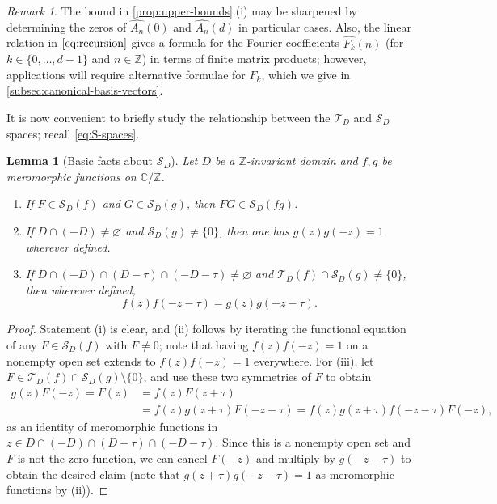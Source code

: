 \documentclass[reqno,11pt]{amsart}
\newtheorem{lemma}[theorem]{Lemma}
\theoremstyle{definition}
\theoremstyle{remark}
\newtheorem*{remark}{Remark}
\numberwithin{equation}{section}
\newcommand{\Z}{\mathbb{Z}}
\newcommand{\C}{\mathbb{C}}
\newcommand{\mT}{\mathcal{T}}
\newcommand{\mS}{\mathcal{S}}
\renewcommand{\hat}{\widehat}
\renewcommand{\emptyset}{\varnothing}
\begin{document}
\begin{remark}
The bound in \cref{prop:upper-bounds}.(i) may be sharpened by determining the zeros of $\hat{A_n}(0)$ and $\hat{A_n}(d)$ in particular cases. Also, the linear relation in $\cref{eq:recursion}$ gives a formula for the Fourier coefficients $\hat{F_k}(n)$ (for $k \in \{0, \ldots, d-1\}$ and $n \in \Z$) in terms of finite matrix products; however, applications will require alternative formulae for $F_k$, which we give in \cref{subsec:canonical-basis-vectors}.
\end{remark}

It is now convenient to briefly study the relationship between the $\mT_D$ and $\mS_D$ spaces; recall \cref{eq:S-spaces}.
\begin{lemma}[Basic facts about $\mS_D$] \label{lem:basic-S}
Let $D$ be a $\Z$-invariant domain and $f, g$ be meromorphic functions on $\C/\Z$.
\begin{enumerate}[label = (\roman*).]
    \item If $F \in \mS_D(f)$ and $G \in \mS_D(g)$, then $FG \in \mS_D(fg)$. 
    \item If $D \cap (-D) \neq \emptyset$ and $\mS_D(g) \neq \{0\}$, then one has $g(z)g(-z) = 1$ wherever defined.
    \item If $D \cap (-D) \cap (D-\tau) \cap (-D-\tau) \neq \emptyset$ and $\mT_D(f) \cap \mS_D(g) \neq \{0\}$, then wherever defined,
    \[
        f(z)f(-z-\tau) = g(z)g(-z-\tau).
    \]
\end{enumerate}
\end{lemma}
\begin{proof}
Statement (i) is clear, and (ii) follows by iterating the functional equation of any $F \in \mS_D(f)$ with $F \neq 0$; note that having $f(z) f(-z) = 1$ on a nonempty open set extends to $f(z)f(-z) = 1$ everywhere. For (iii), let $F \in \mT_D(f) \cap \mS_D(g) \setminus \{0\}$, and use these two symmetries of $F$ to obtain
\[
\begin{aligned}
    g(z)F(-z) = F(z) &= f(z)F(z+\tau) \\
    &= f(z)g(z+\tau) F(-z-\tau)
    =
    f(z)g(z+\tau)f(-z-\tau)F(-z),
\end{aligned}
\]
as an identity of meromorphic functions in $z \in D \cap (-D) \cap (D-\tau) \cap (-D-\tau)$. Since this is a nonempty open set and $F$ is not the zero function, we can cancel $F(-z)$ and multiply by $g(-z-\tau)$ to obtain the desired claim (note that $g(z+\tau)g(-z-\tau) = 1$ as meromorphic functions by (ii)). 
\end{proof}
\end{document}
